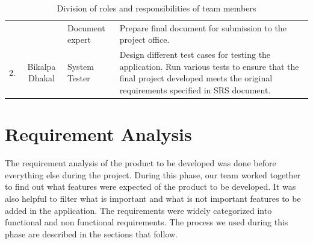 \documentclass[12pt, a4paper, oneside]{article}
\begin{document}
\begin{table}[H]
\begin{tabularx}{\linewidth}{|c|c|p{2cm}|X|}
                     &                                    & Document expert  & Prepare final document for submission to the project office.                                                                                                                     \\ \cline{3-4} 
\multirow{-5}{*}{2.} & \multirow{-5}{*}{Bikalpa Dhakal}   & System Tester         & Design different test cases for testing the application. \newline Run various tests to ensure that the final project developed meets the original requirements specified in SRS document. \\ \hline
\end{tabularx}
\caption{Division of roles and responsibilities of team members}
\label{table:team-roles}
\end{table}






\pagebreak
\section{Requirement Analysis}
The requirement analysis of the product to be developed was done before everything else during the project. During this phase, our team worked together to find out what features were expected of the product to be developed. It was also helpful to filter what is important and what is not important features to be added in the application. The requirements were widely categorized into functional and non functional requirements. The process we used during this phase are described in the sections that follow.

% 

\end{document}
